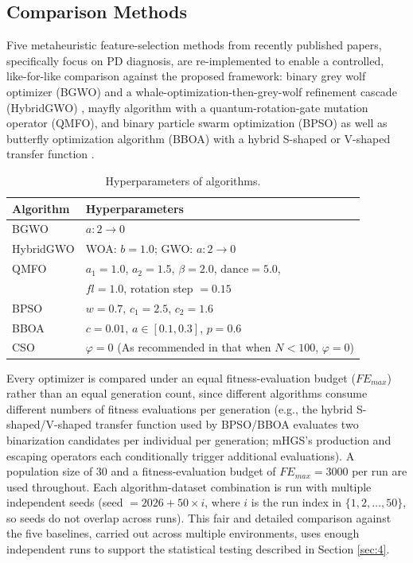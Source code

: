 \subsection{Comparison Methods} \label{sec:3.7}
Five metaheuristic feature-selection methods from recently published papers, specifically focus on PD diagnosis, are re-implemented to enable a controlled, like-for-like comparison against the proposed framework: binary grey wolf optimizer (BGWO) and a whale-optimization-then-grey-wolf refinement cascade (HybridGWO) \cite{AlNajjar:2024}, mayfly algorithm with a quantum-rotation-gate mutation operator (QMFO)\cite{Mansour:2024}, and binary particle swarm optimization (BPSO) as well as butterfly optimization algorithm (BBOA) with a hybrid S-shaped or V-shaped transfer function \cite{Hashemi:2026}.
\begin{table}[t]
  \centering
  \renewcommand{\arraystretch}{1.2}
  \caption{Hyperparameters of algorithms.}
  \label{tab:hyperparameters}
  \begin{tabular}{ll}
    \toprule
    Algorithm & Hyperparameters \\
    \midrule
    BGWO & $a: 2\to0$ \\
    HybridGWO & WOA: $b=1.0$; GWO: $a: 2\to0$  \\
    QMFO & $a_1=1.0$, $a_2=1.5$, $\beta=2.0$, $\text{dance}=5.0$, \\
    ~ & $fl=1.0$, rotation step $=0.15$ \\
    BPSO & $w=0.7$, $c_1=2.5$, $c_2=1.6$ \\
    BBOA & $c=0.01$, $a \in [0.1, 0.3]$, $p=0.6$  \\
    CSO & $\varphi=0$ (As recommended in \cite{Cheng:2015} that when $N<100$, $\varphi=0$)  \\
    \bottomrule
  \end{tabular}
\end{table}

Every optimizer is compared under an equal fitness-evaluation budget ($FE_{max}$) rather than an equal generation count, since different algorithms consume different numbers of fitness evaluations per generation (e.g., the hybrid S-shaped/V-shaped transfer function used by BPSO/BBOA evaluates two binarization candidates per individual per generation; mHGS's production and escaping operators each conditionally trigger additional evaluations). A population size of 30 and a fitness-evaluation budget of $FE_{max} = 3000$ per run are used throughout. Each algorithm-dataset combination is run with multiple independent seeds (seed $= 2026 + 50 \times i$, where $i$ is the run index in $\{1, 2, \dots, 50\}$, so seeds do not overlap across runs). This fair and detailed comparison against the five baselines, carried out across multiple environments, uses enough independent runs to support the statistical testing described in Section \ref{sec:4}.



